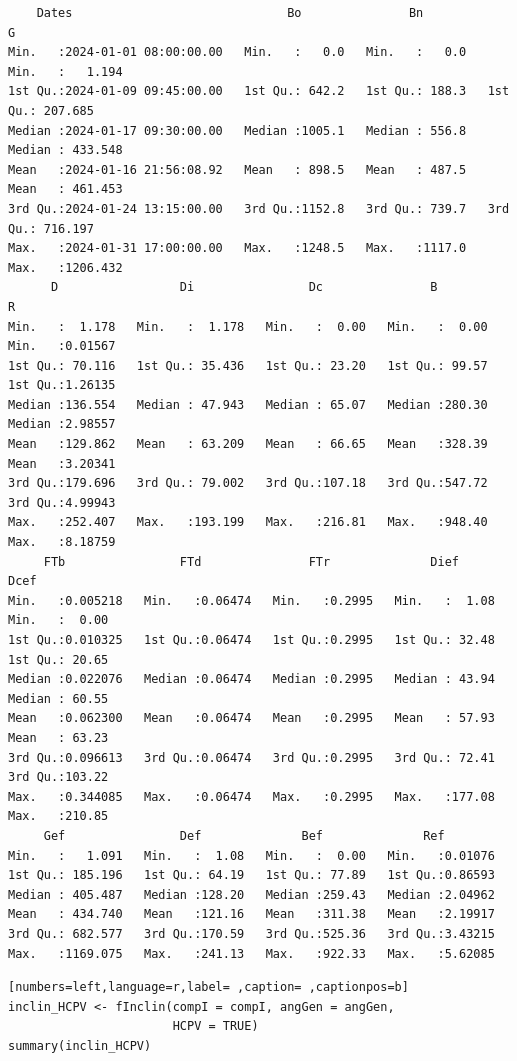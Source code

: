\begin{itemize}
\begin{verbatim}
    Dates                              Bo               Bn               G           
Min.   :2024-01-01 08:00:00.00   Min.   :   0.0   Min.   :   0.0   Min.   :   1.194  
1st Qu.:2024-01-09 09:45:00.00   1st Qu.: 642.2   1st Qu.: 188.3   1st Qu.: 207.685  
Median :2024-01-17 09:30:00.00   Median :1005.1   Median : 556.8   Median : 433.548  
Mean   :2024-01-16 21:56:08.92   Mean   : 898.5   Mean   : 487.5   Mean   : 461.453  
3rd Qu.:2024-01-24 13:15:00.00   3rd Qu.:1152.8   3rd Qu.: 739.7   3rd Qu.: 716.197  
Max.   :2024-01-31 17:00:00.00   Max.   :1248.5   Max.   :1117.0   Max.   :1206.432  
      D                 Di                Dc               B                R          
Min.   :  1.178   Min.   :  1.178   Min.   :  0.00   Min.   :  0.00   Min.   :0.01567  
1st Qu.: 70.116   1st Qu.: 35.436   1st Qu.: 23.20   1st Qu.: 99.57   1st Qu.:1.26135  
Median :136.554   Median : 47.943   Median : 65.07   Median :280.30   Median :2.98557  
Mean   :129.862   Mean   : 63.209   Mean   : 66.65   Mean   :328.39   Mean   :3.20341  
3rd Qu.:179.696   3rd Qu.: 79.002   3rd Qu.:107.18   3rd Qu.:547.72   3rd Qu.:4.99943  
Max.   :252.407   Max.   :193.199   Max.   :216.81   Max.   :948.40   Max.   :8.18759  
     FTb                FTd               FTr              Dief             Dcef       
Min.   :0.005218   Min.   :0.06474   Min.   :0.2995   Min.   :  1.08   Min.   :  0.00  
1st Qu.:0.010325   1st Qu.:0.06474   1st Qu.:0.2995   1st Qu.: 32.48   1st Qu.: 20.65  
Median :0.022076   Median :0.06474   Median :0.2995   Median : 43.94   Median : 60.55  
Mean   :0.062300   Mean   :0.06474   Mean   :0.2995   Mean   : 57.93   Mean   : 63.23  
3rd Qu.:0.096613   3rd Qu.:0.06474   3rd Qu.:0.2995   3rd Qu.: 72.41   3rd Qu.:103.22  
Max.   :0.344085   Max.   :0.06474   Max.   :0.2995   Max.   :177.08   Max.   :210.85  
     Gef                Def              Bef              Ref         
Min.   :   1.091   Min.   :  1.08   Min.   :  0.00   Min.   :0.01076  
1st Qu.: 185.196   1st Qu.: 64.19   1st Qu.: 77.89   1st Qu.:0.86593  
Median : 405.487   Median :128.20   Median :259.43   Median :2.04962  
Mean   : 434.740   Mean   :121.16   Mean   :311.38   Mean   :2.19917  
3rd Qu.: 682.577   3rd Qu.:170.59   3rd Qu.:525.36   3rd Qu.:3.43215  
Max.   :1169.075   Max.   :241.13   Max.   :922.33   Max.   :5.62085
\end{verbatim}

\begin{lstlisting}[numbers=left,language=r,label= ,caption= ,captionpos=b]
inclin_HCPV <- fInclin(compI = compI, angGen = angGen,
                       HCPV = TRUE)
summary(inclin_HCPV)
\end{lstlisting}


\end{itemize}
